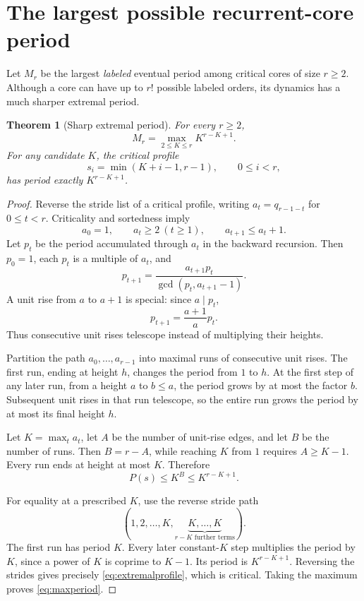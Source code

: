 \documentclass[11pt,letterpaper]{article}
\newtheorem{theorem}{Theorem}[section]
\theoremstyle{definition}
\begin{document}
\section{The largest possible recurrent-core period}\label{sec:extremal}
Let $M_r$ be the largest \emph{labeled} eventual period among critical cores
of size $r\ge2$. Although a core can have up to $r!$ possible labeled orders,
its dynamics has a much sharper extremal period.

\begin{theorem}[Sharp extremal period]\label{thm:extremal}
For every $r\ge2$,
\begin{equation}\label{eq:maxperiod}
 \boxed{\qquad M_r=\max_{2\le K\le r}K^{r-K+1}.\qquad}
\end{equation}
For any candidate $K$, the critical profile
\begin{equation}\label{eq:extremalprofile}
 s_i=\min(K+i-1,r-1),\qquad 0\le i<r,
\end{equation}
has period exactly $K^{r-K+1}$.
\end{theorem}
\begin{proof}
Reverse the stride list of a critical profile, writing
$a_t=q_{r-1-t}$ for $0\le t<r$. Criticality and sortedness imply
\[
 a_0=1,\qquad a_t\ge2\ (t\ge1),\qquad a_{t+1}\le a_t+1.
\]
Let $p_t$ be the period accumulated through $a_t$ in the backward recursion.
Then $p_0=1$, each $p_t$ is a multiple of $a_t$, and
\[
 p_{t+1}=\frac{a_{t+1}p_t}{\gcd(p_t,a_{t+1}-1)}.
\]
A unit rise from $a$ to $a+1$ is special: since $a\mid p_t$,
\begin{equation}\label{eq:rise}
 p_{t+1}=\frac{a+1}{a}p_t.
\end{equation}
Thus consecutive unit rises telescope instead of multiplying their heights.

Partition the path $a_0,\ldots,a_{r-1}$ into maximal runs of consecutive
unit rises. The first run, ending at height $h$, changes the period from
$1$ to $h$. At the first step of any later run, from a height $a$ to
$b\le a$, the period grows by at most the factor $b$. Subsequent unit rises
in that run telescope, so the entire run grows the period by at most its
final height $h$.

Let $K=\max_ta_t$, let $A$ be the number of unit-rise edges, and let $B$
be the number of runs. Then $B=r-A$, while reaching $K$ from $1$ requires
$A\ge K-1$. Every run ends at height at most $K$. Therefore
\[
 P(s)\le K^B\le K^{r-K+1}.
\]

For equality at a prescribed $K$, use the reverse stride path
\[
 (1,2,\ldots,K,\underbrace{K,\ldots,K}_{r-K\text{ further terms}}).
\]
The first run has period $K$. Every later constant-$K$ step multiplies the
period by $K$, since a power of $K$ is coprime to $K-1$. Its period is
$K^{r-K+1}$. Reversing the strides gives precisely
\eqref{eq:extremalprofile}, which is critical. Taking the maximum proves
\eqref{eq:maxperiod}.
\end{proof}
\end{document}
